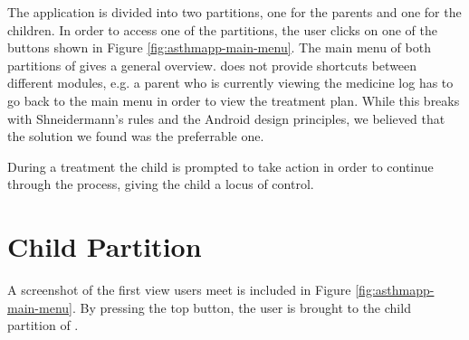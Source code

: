 The application is divided into two partitions, one for the parents and one for the children. In order to access one of the partitions, the user clicks on one of the buttons shown in Figure \ref{fig:asthmapp-main-menu}. The main menu of both partitions of \app{} gives a general overview. \app{} does not provide shortcuts between different modules, e.g. a parent who is currently viewing the medicine log has to go back to the main menu in order to view the treatment plan. While this breaks with Shneidermann's rules and the Android design principles, we believed that the solution we found was the preferrable one.  

During a treatment the child is prompted to take action in order to continue through the process, giving the child a locus of control. 



\clearpage{}

\section{Child Partition}
\label{sec:description-child-partition}

A screenshot of the first view users meet is included in Figure \ref{fig:asthmapp-main-menu}. By pressing the top button, the user is brought to the child partition of \app{}. 

